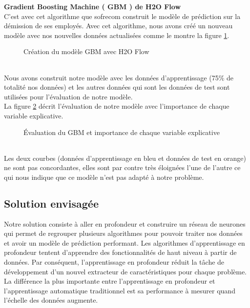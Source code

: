 \newpage
\textbf{Gradient Boosting Machine ( GBM ) de H2O Flow} \\
C'est avec cet algorithme que sofrecom construit le modèle de prédiction sur la démission de ses employés. Avec cet algorithme, nous avons créé un nouveau modèle avec nos nouvelles données actualisées comme le montre la figure     \ref{fig:GBM1}. 
   \begin{figure}[htpb]
    \centering
    \caption{Création du modèle GBM avec H2O Flow}
    \label{fig:GBM1}
    \end{figure} \\
Nous avons construit notre modèle avec les données d'apprentissage (75\% de totalité nos données) et les autres données qui sont les données de test sont utilisées pour l'évaluation de notre modèle.\\
La figure \ref{fig:GBM2} décrit l'évaluation de notre modèle avec l'importance de chaque variable explicative.
   \begin{figure}[htpb]
    \centering
    \caption{Évaluation du GBM et importance de chaque variable explicative}
    \label{fig:GBM2}
    \end{figure}\\
Les deux courbes (données d'apprentissage en bleu et données de test en orange) ne sont pas concordantes, elles sont par contre très éloignées l'une de l'autre ce qui nous indique que ce modèle n'est pas adapté à notre problème.
\newpage
\subsection{Solution envisagée}
Notre solution consiste à aller en profondeur et construire un réseau de neurones qui permet de regrouper plusieurs algorithmes pour pouvoir traiter nos données et avoir un modèle de prédiction performant.
Les algorithmes d'apprentissage en profondeur tentent d'apprendre des fonctionnalités de haut niveau à partir de données. Par conséquent, l'apprentissage en profondeur réduit la tâche de développement d'un nouvel extracteur de caractéristiques pour chaque problème.\\
La différence la plus importante entre l'apprentissage en profondeur et l'apprentissage automatique traditionnel est sa performance à mesurer quand l'échelle des données augmente. 


